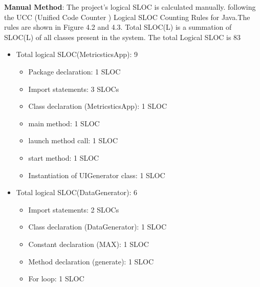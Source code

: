 \documentclass[12pt,letterpaper]{report}
\begin{document}
\textbf{Manual Method}: The project's logical SLOC is calculated manually. following the UCC (Unified Code Counter ) Logical SLOC Counting Rules for Java.The rules are shown in Figure 4.2 and 4.3. Total SLOC(L) is a summation of SLOC(L) of all classes present in the system. The total Logical SLOC is 83 \\
\begin{itemize}
 \item Total logical SLOC(MetricsticsApp): 9
     \\
     \begin{itemize}
     \item Package declaration: 1 SLOC
    \item Import statements: 3 SLOCs
    \item Class declaration (MetricsticsApp): 1 SLOC
    \item main method: 1 SLOC
    \item launch method call: 1 SLOC
    \item start method: 1 SLOC
    \item Instantiation of UIGenerator class: 1 SLOC
   \\
  \end{itemize}
 \end{itemize}
\begin{itemize}
      \item Total logical SLOC(DataGenerator): 6
      \\
       \begin{itemize}
    \item Import statements: 2 SLOCs
    \item Class declaration (DataGenerator): 1 SLOC
    \item Constant declaration (MAX): 1 SLOC
    \item Method declaration (generate): 1 SLOC
    \item For loop: 1 SLOC
    \\
  \end{itemize}
\end{itemize}
\end{document}
